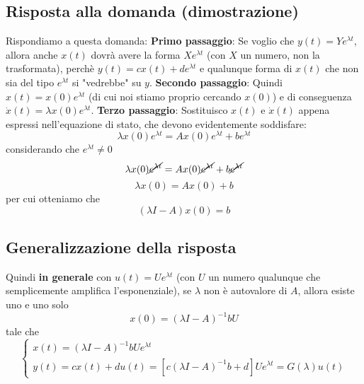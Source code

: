 \subsection{Risposta alla domanda (dimostrazione)}
Rispondiamo a questa domanda:\newline
\textbf{Primo passaggio}:\newline
Se voglio che $y(t) = Y e^{\lambda t}$, allora anche $x(t)$ dovrà avere la forma $X e^{\lambda t}$ (con $X$ un numero, non la trasformata), perchè $y(t) = cx(t) + de^{\lambda t}$ e qualunque forma di $x(t)$ che non sia del tipo $e^{\lambda t}$ si "vedrebbe" su $y$.\newline
\newline
\textbf{Secondo passaggio}:\newline
Quindi $x(t) = x(0) e ^{\lambda t}$ (di cui noi stiamo proprio cercando $x(0)$) e di conseguenza $\dot{x}(t) = \lambda x(0) e^{\lambda t}$.\newline
\newline
\textbf{Terzo passaggio}:\newline
Sostituisco $x(t)$ e $\dot{x}(t)$ appena espressi nell'equazione di stato, che devono evidentemente soddisfare:
\[
    \lambda x(0) e^{\lambda t} = A x(0) e^{\lambda t} + b e^{\lambda t}
\]
considerando che $e^{\lambda t} \neq 0$
\[
    \lambda x(0) \cancel{e^{\lambda t}} = A x(0) \cancel{e^{\lambda t}} + b \cancel{e^{\lambda t}}
\]
\[
    \lambda x(0)  = A x(0)  + b 
\]
per cui otteniamo che
\[
    (\lambda I - A) x(0) = b
\]
\subsection{Generalizzazione della risposta}
Quindi \textbf{in generale} con $u(t) = U e^{\lambda t}$ (con $U$ un numero qualunque che semplicemente amplifica l'esponenziale), se $\lambda$ non è autovalore di $A$, allora esiste uno e uno solo 
\[
    x(0) = (\lambda I - A)^{-1}b U
\] tale che 
\[
    \begin{cases}
        x(t) = (\lambda I -A)^{-1} b U e^{\lambda t}\\
        y(t) = cx(t) + du(t) =  [c(\lambda I -A)^{-1} b + d] U e^{\lambda t} = G(\lambda) u(t)
    \end{cases}
\]
